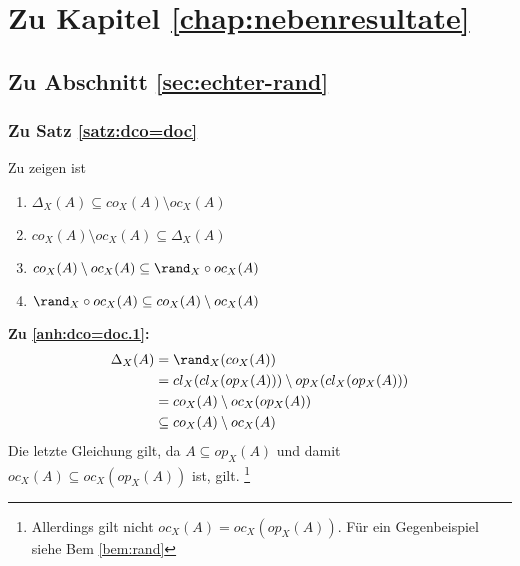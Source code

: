 \section{Zu Kapitel \ref{chap:nebenresultate}}

\subsection{Zu Abschnitt \ref{sec:echter-rand}}


\subsubsection{Zu Satz \ref{satz:dco=doc}} \label{anh:doc=doc} 
Zu zeigen ist
\begin{enumerate}
	\item $\Delta_X(A) \subseteq co_X(A) \setminus oc_X(A)$ \label{anh:dco=doc.1}
	\item $co_X(A) \setminus oc_X(A) \subseteq \Delta_X(A)$ \label{anh:dco=doc.2}
	\item $co_X(A) \setminus oc_X(A) \subseteq \rand_X \circ oc_X(A)$ \label{anh:dco=doc.3}
	\item $\rand_X \circ oc_X(A) \subseteq co_X(A) \setminus oc_X(A)$\label{anh:dco=doc.4}
\end{enumerate}

\noindent
\textbf{Zu \ref{anh:dco=doc.1}:}
	\begin{align*}
		\Delta_X(A) &= \rand_X(co_X(A)) \\
		&= cl_X(cl_X(op_X(A))) \setminus op_X(cl_X(op_X(A))) \\
		&= co_X(A) \setminus oc_X(op_X(A)) \\
		&\subseteq co_X(A) \setminus oc_X(A)
	\end{align*} 
	Die letzte Gleichung gilt, da $A \subseteq op_X(A)$ und damit $oc_X(A) \subseteq oc_X(op_X(A))$ ist, gilt.
	\footnote{Allerdings gilt nicht $oc_X(A) = oc_X(op_X(A))$. Für ein Gegenbeispiel siehe Bem \ref{bem:rand} }
\\

